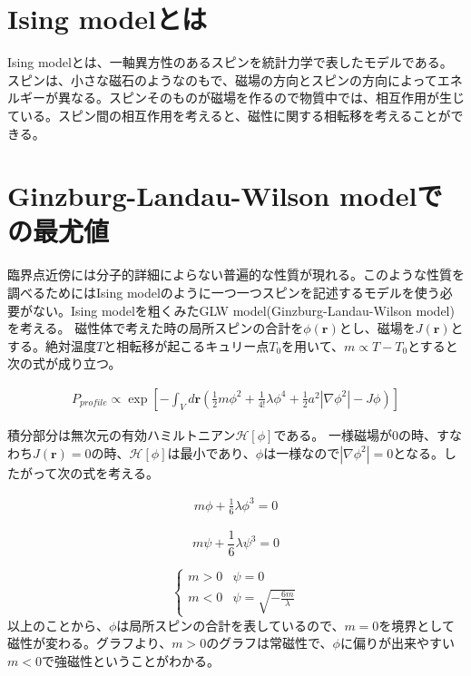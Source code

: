 \documentclass[a4paper,12pt, oneside, openany]{jsbook}
\begin{document}
\section{Ising modelとは}
Ising modelとは、一軸異方性のあるスピンを統計力学で表したモデルである。スピンは、小さな磁石のようなのもで、磁場の方向とスピンの方向によってエネルギーが異なる。スピンそのものが磁場を作るので物質中では、相互作用が生じている。スピン間の相互作用を考えると、磁性に関する相転移を考えることができる。

\section{Ginzburg-Landau-Wilson modelでの最尤値}

臨界点近傍には分子的詳細によらない普遍的な性質が現れる。このような性質を調べるためにはIsing modelのように一つ一つスピンを記述するモデルを使う必要がない。Ising modelを粗くみたGLW model(Ginzburg-Landau-Wilson model)を考える。
磁性体で考えた時の局所スピンの合計を$\phi(\boldsymbol{r})$とし、磁場を$J(\boldsymbol{r})$とする。絶対温度$T$と相転移が起こるキュリー点$T_0$を用いて、$m \propto T-T_0$とすると次の式が成り立つ。

\begin{align}\label{eq:2.1}
P_{profile} \propto \exp\left[-\int_V d\boldsymbol{r} \left(\frac{1}{2}m \phi^2+\frac{1}{4!} \lambda\phi^4+\frac{1}{2}a^2|\nabla\phi^2|-J\phi\right)\right]
\end{align}

\indent 積分部分は無次元の有効ハミルトニアン$\mathcal{H}[\phi]$である。
一様磁場が0の時、すなわち$J(\boldsymbol{r})=0$の時、$\mathcal{H}[\phi]$は最小であり、$\phi$は一様なので$|\nabla\phi^2|=0$となる。したがって次の式を考える。

\begin{align}\label{eq:2.2}
m\phi+\frac{1}{6}\lambda\phi^3=0
\end{align}

\begin{equation}
  m\psi+\frac{1}{6}\lambda\psi^3=0
\end{equation}

\begin{equation}
   \begin{cases}
  m>0 & \psi=0 \\
  m<0 & \psi=\sqrt{-\frac{6m}{\lambda}}
  \end{cases}
\end{equation}
以上のことから、$\phi$は局所スピンの合計を表しているので、$m=0$を境界として磁性が変わる。グラフより、$m>0$のグラフは常磁性で、$\phi$に偏りが出来やすい$m<0$で強磁性ということがわかる。
\end{document}
